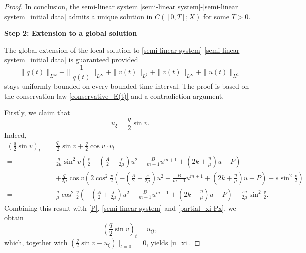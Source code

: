 \documentclass[10pt]{article}
\numberwithin{equation}{section}
\begin{document}
\begin{proof}
		In conclusion, the semi-linear system \eqref{semi-linear system}-\eqref{semi-linear system_initial data} admits a unique solution in $C([0,T];X)$ for some $T>0$.
		
		\textbf{Step 2: Extension to a global solution}
		
		The global extension of the local solution to \eqref{semi-linear system}-\eqref{semi-linear system_initial data} is guaranteed provided
		\begin{equation}\label{extension_5}
			\|q(t)\|_{L^\infty}+\|\frac{1}{q(t)}\|_{L^\infty}+\|v(t)\|_{L^2}+\|v(t)\|_{L^\infty}+\|u(t)\|_{H^1}
		\end{equation}
		stays uniformly bounded on every bounded time interval. The proof is based on the conservation law \eqref{conservative_E(t)} and a contradiction argument. 
		
		Firstly, we claim that
		\begin{equation}\label{u_xi}
			u_\xi=\frac{q}{2}\sin v.
		\end{equation}
		Indeed, 
		\begin{align*}
			\left(\frac{q}{2}\sin v\right)_t=&\frac{q_t}{2}\sin v+\frac{q}{2}\cos v\cdot v_t\\
			=&\frac{q}{2\mu}\sin^2 v\left(\frac{s}{2}-\left(\frac A2+\frac{s}{2\mu}\right)u^2-\frac{B}{m+1}u^{m+1}+\left(2k+\frac{\eta}{\mu}\right)u-P\right)\\
			&+\frac{q}{2\mu}\cos v\left(2\cos^2\frac{v}{2}\left(-\left(\frac A2+\frac{s}{2\mu}\right)u^2-\frac{B}{m+1}u^{m+1}+\left(2k+\frac{\eta}{\mu}\right)u-P\right)-s\sin^2\frac{v}{2}\right)\\
			=&\frac{q}{\mu}\cos^2\frac{v}{2}\left(-\left(\frac A2+\frac{s}{2\mu}\right)u^2-\frac{B}{m+1}u^{m+1}+\left(2k+\frac{\eta}{\mu}\right)u-P\right)+\frac{sq}{2\mu}\sin^2\frac{v}{2}.
		\end{align*}
		Combining this result with \eqref{P}, \eqref{semi-linear system} and \eqref{partial_xi Px}, we obtain
		$$\left(\frac{q}{2}\sin v\right)_t=u_{\xi t},$$
		which, together with $\left(\frac{q}{2}\sin v-u_{\xi}\right)\mid_{t=0}=0$, yields \eqref{u_xi}.
		

\end{proof}
\end{document}
